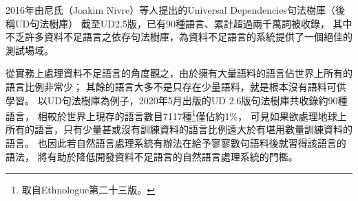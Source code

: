 2016年由尼氏（Joakim Nivre）等人提出的Universal Dependencies句法樹庫\cite{Nivre2016UniversalDV}（後稱UD句法樹庫）
截至UD2.5版，已有90種語言、累計超過兩千萬詞被收錄\cite{Nivre2020UniversalDV}，
其中不乏許多資料不足語言之依存句法樹庫，為資料不足語言的系統提供了一個絕佳的測試場域。

從實務上處理資料不足語言的角度觀之，由於擁有大量語料的語言佔世界上所有的語言比例非常少；
其餘的語言大多不是只存在少量語料，就是根本沒有語料可供學習。
以UD句法樹庫為例子，2020年5月出版的UD 2.6版句法樹庫共收錄約90種語言，
相較於世界上現存的語言數目7117種\footnote{取自Ethnologue第二十三版\cite{eberhard2020ethnologue}。}僅佔約1\%，
可見如果欲處理地球上所有的語言，只有少量甚或沒有訓練資料的語言比例遠大於有堪用數量訓練資料的語言。
也因此若自然語言處理系統有辦法在給予寥寥數句語料後就習得該語言的語法，
將有助於降低開發資料不足語言的自然語言處理系統的門檻。

\iffalse
原因有兩點：
然而多語言訓練的目標，是提高訓練語言（training languages）在其測試集（testing set）上的準確率，
而提高訓練語言的準確率，未必就代表在資料不足語言上的準確率也會隨之提高；
有可能出現訓練語言與資料不足語言差異過大，而導致多語言訓練模型無法幫助資料不足語言的任務表現。
芬氏（Chelsea Finn）在2018年提出的模型無關元學習（model-agnostic meta-learning）
\cite{Finn2017ModelAgnosticMF}為所有使用梯度下降法（gradient descent）進行最佳化的模型的提供了一項簡潔且有效的方法處理資料不足任務。
在語言轉移學習的框架下，其目標是替未見過的語言（unseen languages）尋找一合適參數初始值，使得少量步數梯度更新後，參數在該語言的測試集上表現最佳。
其強調使用少量步數進行梯度更新，即是由於資料不足語言資料稀少，過多步數容易過擬合。
不若單純的多語言訓練，模型無關元學習於訓練階段的目標並非提高在訓練語言上的表現，
而是直接最佳化模型在未見過語言上調適（fine-tuning）後的表現，訓練與測試環境沒有不匹配之處，
有效防止模型只在訓練語言的測試集上有好表現，而無法推廣到資料不足語言上的問題。
\fi

